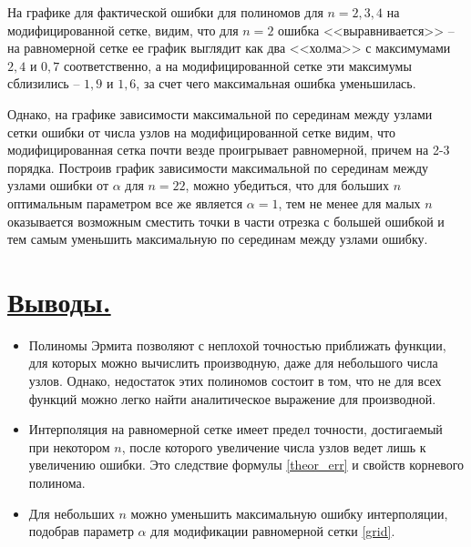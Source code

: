 \documentclass[a4paper, 12pt]{article}
\begin{document}
	На графике для фактической ошибки для полиномов для $n=2,3,4$ на модифицированной сетке, видим, что для $n=2$ ошибка <<выравнивается>> -- на равномерной сетке ее график выглядит как два <<холма>> с максимумами $2,4$ и $0,7$ соответственно, а на модифицированной сетке эти максимумы сблизились -- $1,9$ и $1,6$, за счет чего максимальная ошибка уменьшилась.
	
	Однако, на графике зависимости максимальной по серединам между узлами сетки ошибки от числа узлов на модифицированной сетке видим, что модифицированная сетка почти везде проигрывает равномерной, причем на 2-3 порядка. Построив график зависимости максимальной по серединам между узлами ошибки от $\alpha$ для $n=22$, можно убедиться, что для больших $n$ оптимальным параметром все же является $\alpha=1$, тем не менее для малых $n$ оказывается возможным сместить точки в части отрезка с большей ошибкой и тем самым уменьшить максимальную по серединам между узлами ошибку.
	
	\section{\underline{Выводы.}}
	
	\begin{itemize}
		\item Полиномы Эрмита позволяют с неплохой точностью приближать функции, для которых можно вычислить производную, даже для небольшого числа узлов. Однако, недостаток этих полиномов состоит в том, что не для всех функций можно легко найти аналитическое выражение для производной.
		\item Интерполяция на равномерной сетке имеет предел точности, достигаемый при некотором $n$, после которого увеличение числа узлов ведет лишь к увеличению ошибки. Это следствие формулы \eqref{theor_err} и свойств корневого полинома.
		\item Для небольших $n$ можно уменьшить максимальную ошибку интерполяции, подобрав параметр $\alpha$ для модификации равномерной сетки \eqref{grid}.
	\end{itemize}
	
\end{document}
